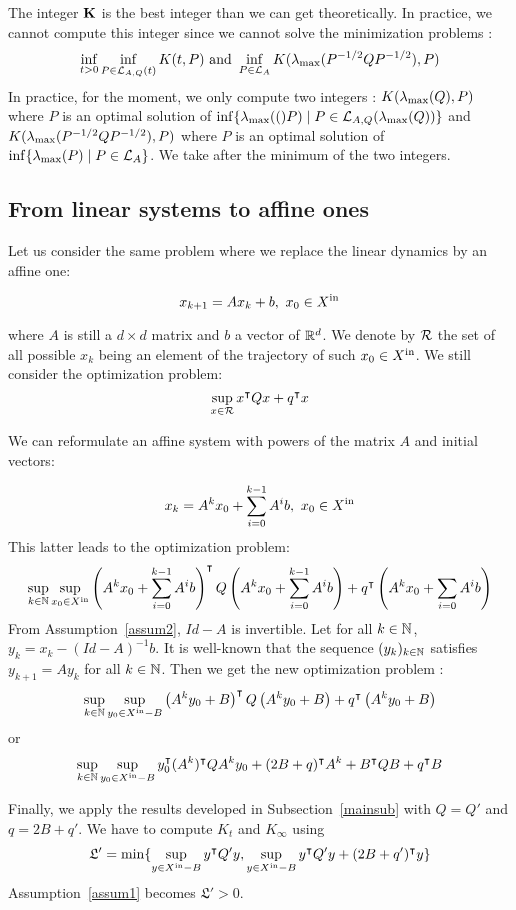 \documentclass[10pt]{article}
\begin{document}
The integer $\mathbf{K}$ is the best integer than we can get theoretically. In practice, we cannot compute this integer since we cannot solve the minimization problems :
\[
\inf_{t>0}\inf_{P\in\mathcal{L}_{A,Q}(t)} K(t,P)\text{ and }\inf_{P\in\mathcal{L}_{A}}K(\lambda_{\operatorname{max}}(P^{-1/2} Q P^{-1/2}),P)
\]
In practice, for the moment, we only compute two integers : $K( \lambda_{\operatorname{max}}(Q),P)$ where $P$ is an optimal solution of $\inf\{\lambda_{\operatorname{max}}(()P)\mid 
P\in \mathcal{L}_{A,Q}(\lambda_{\operatorname{max}}(Q))\}$ and $K(\lambda_{\operatorname{max}}(P^{-1/2} Q P^{-1/2}),P)$ where $P$ is an optimal solution of $\inf\{\lambda_{\operatorname{max}}(P)\mid P\in\mathcal{L}_{A}\}$. We take after the minimum of the  two integers.

\subsection{From linear systems to affine ones}
\label{affine}
Let us consider the same problem where we replace the linear dynamics by an affine one:

\[
x_{k+1}=A x_k+b,\ x_0\in X^\mathrm{in}
\]

where $A$ is still a $d\times d$ matrix and $b$ a vector of $\mathbb R^d$. We denote by $\mathcal{R}$ the set of all possible $x_k$ being an element of the trajectory of such $x_0\in X^\mathrm{in}$. We still consider the optimization problem:
\[
\sup_{x\in\mathcal{R}} x^\intercal Q x+q^\intercal x
\]

We can reformulate an affine system with powers of the matrix $A$ and initial vectors: 

\[
x_{k}=A^k x_0+\sum_{i=0}^{k-1} A^i b,\ x_0\in \xin
\]
This latter leads to the optimization problem:
\[
\sup_{k\in\mathbb{N}} \sup_{x_0\in X^\mathrm{in}} \left(A^k x_0+\sum_{i=0}^{k-1} A^i b\right)^\intercal Q  \left(A^k x_0+\sum_{i=0}^{k-1} A^i b\right)+q^\intercal  \left(A^k x_0+\sum_{i=0} A^i b\right)
\]
From Assumption~\ref{assum2}, $Id-A$ is invertible. Let for all $k\in\mathbb{N}$, $y_k=x_k-(Id-A)^{-1} b$. It is well-known that the sequence $(y_k)_{k\in\mathbb{N}}$ satisfies $y_{k+1}=A y_k$ for all $k\in\mathbb{N}$. Then we get the new optimization problem : 
\[
\sup_{k\in\mathbb{N}} \sup_{y_0\in X^\mathrm{in}-B} \left(A^k y_0+B\right)^\intercal Q  \left(A^k y_0+B\right)+q^\intercal  \left(A^k y_0+B\right)
\]
or
\[
\sup_{k\in\mathbb{N}} \sup_{y_0\in X^\mathrm{in}-B} y_0^\intercal (A^k)^\intercal Q  A^k y_0+(2B+q)^\intercal A^k +B^\intercal Q B+q^\intercal B
\]

Finally, we apply the results developed in Subsection~\ref{mainsub} with $Q=Q'$ and $q=2B+q'$. We have to compute $K_t$ and $K_\infty$ using 
\[
\mathfrak{L}'=\min\{\sup_{y\in X^\mathrm{in}-B} y^\intercal Q' y,\sup_{y\in X^\mathrm{in}-B} y^\intercal Q' y+(2B+q')^\intercal y\}
\]
Assumption~\ref{assum1} becomes $\mathfrak{L}'>0$.
\end{document}

